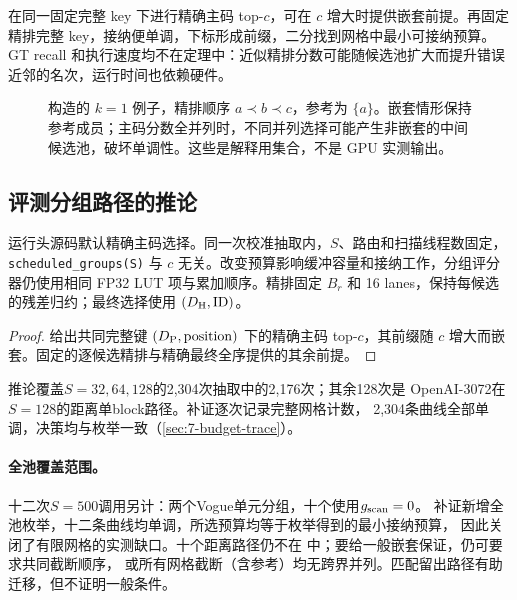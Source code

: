 在同一固定完整 key 下进行精确主码 top-$c$，可在 $c$ 增大时提供嵌套前提。再固定精排完整 key，接纳便单调，下标形成前缀，二分找到网格中最小可接纳预算。GT recall 和执行速度均不在定理中：近似精排分数可能随候选池扩大而提升错误近邻的名次，运行时间也依赖硬件。

\begin{figure}[tbp]
\centering

\caption[嵌套与非嵌套候选池]{构造的 $k=1$ 例子，精排顺序 $a\prec b\prec c$，参考为 $\{a\}$。嵌套情形保持参考成员；主码分数全并列时，不同并列选择可能产生非嵌套的中间候选池，破坏单调性。这些是解释用集合，不是 GPU 实测输出。}
\label{fig:6-nesting}
\end{figure}

\subsection{评测分组路径的推论}

运行头源码默认精确主码选择。同一次校准抽取内，$S$、路由和扫描线程数固定，\texttt{scheduled\_groups(S)} 与 $c$ 无关。改变预算影响缓冲容量和接纳工作，分组评分器仍使用相同 FP32 LUT 项与累加顺序。精排固定 $B_r$ 和 16 lanes，保持每候选的残差归约；最终选择使用 $(D_{\mathrm{H}},\mathrm{ID})$。

\par\noindent\begin{minipage}{\linewidth}
\begin{proof}
给出共同完整键 $(D_{\mathrm{P}},\mathrm{position})$ 下的精确主码 top-$c$，其前缀随 $c$ 增大而嵌套。固定的逐候选精排与精确最终全序提供的其余前提。
\end{proof}
\end{minipage}\par\medskip

推论覆盖$S=32,64,128$的2,304次抽取中的2,176次；其余128次是
OpenAI-3072在$S=128$的距离单block路径。补证逐次记录完整网格计数，
2,304条曲线全部单调，决策均与枚举一致（\cref{sec:7-budget-trace}）。

\paragraph{全池覆盖范围。}
十二次$S=500$调用另计：两个Vogue单元分组，十个使用$g_{\mathrm{scan}}=0$。
补证新增全池枚举，十二条曲线均单调，所选预算均等于枚举得到的最小接纳预算，
因此关闭了有限网格的实测缺口。十个距离路径仍不在
中；要给一般嵌套保证，仍可要求共同截断顺序，
或所有网格截断（含参考）均无跨界并列。匹配留出路径有助迁移，但不证明一般条件。

